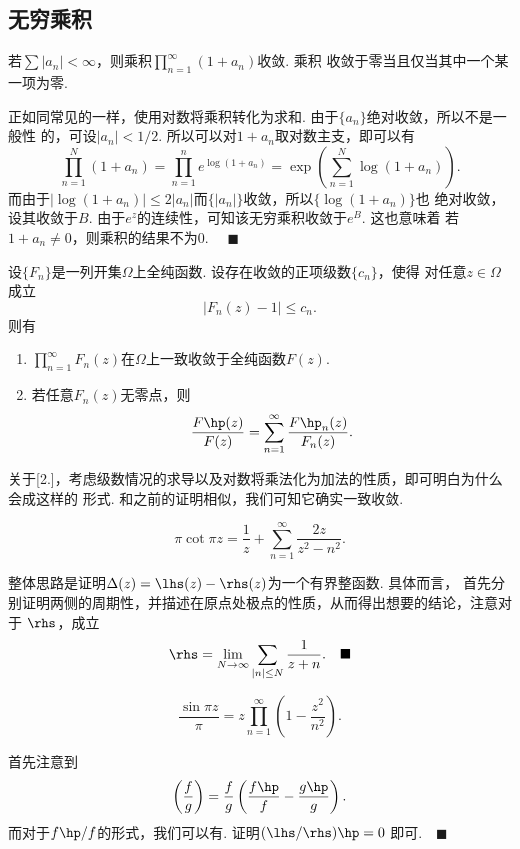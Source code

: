 
\subsection{无穷乘积}
  \begin{thm}
    若$\sum|a_n|<\infty$，则乘积$\prod_{n=1}^\infty(1+a_n)$收敛. 乘积
    收敛于零当且仅当其中一个某一项为零.
  \end{thm}
  \proof
    正如同常见的一样，使用对数将乘积转化为求和. 由于$\{a_n\}$绝对收敛，所以不是一般性
    的，可设$|a_n|<1/2$. 所以可以对$1+a_n$取对数主支，即可以有
    \[
      \prod_{n=1}^N(1+a_n) = \prod_{n=1}^ne^{\log(1+a_n)}
      = \exp\left(\sum_{n=1}^N\log(1+a_n)\right).
    \]
    而由于$|\log(1+a_n)|\le 2|a_n|$而$\{|a_n|\}$收敛，所以$\{\log(1+a_n)\}$也
    绝对收敛，设其收敛于$B$. 由于$e^z$的连续性，可知该无穷乘积收敛于$e^B$. 这也意味着
    若$1+a_n\ne 0$，则乘积的结果不为$0$. $\quad\blacksquare$

  \begin{thm}
    \label{thm: 无穷乘积、导数}
    设$\{F_n\}$是一列开集$\Omega$上全纯函数. 设存在收敛的正项级数$\{c_n\}$，使得
    对任意$z\in\Omega$成立
    \[
      |F_n(z) - 1| \le c_n.
    \]
    则有
    \begin{enumerate}
      \item $\prod_{n=1}^\infty F_n(z)$在$\Omega$上一致收敛于全纯函数$F(z)$.
      \item 若任意$F_n(z)$无零点，则
        \[
          \frac{F\hp(z)}{F(z)} = \sum_{n=1}^\infty\frac{F\hp_n(z)}{F_n(z)}.
        \]
    \end{enumerate}
  \end{thm}
  \remark
    关于[2.]，考虑级数情况的求导以及对数将乘法化为加法的性质，即可明白为什么会成这样的
    形式.
  \proof
    和之前的证明相似，我们可知它确实一致收敛.     

  \begin{thm}
    \label{thm: cot级数展开}
    \[
      \pi\cot\pi z=\frac{1}{z}+\sum_{n=1}^\infty\frac{2z}{z^2-n^2}.
    \]
  \end{thm}
  \proof
    整体思路是证明$\Delta(z) = \lhs(z) -  \rhs(z)$为一个有界整函数. 具体而言，
    首先分别证明两侧的周期性，并描述在原点处极点的性质，从而得出想要的结论，注意对于
    $\rhs$，成立
    \[
      \rhs = \lim_{N\to\infty}\sum_{|n|\le N}\frac{1}{z+n}. \quad\blacksquare
    \]

  \begin{thm}
    \[
      \frac{\sin\pi z}{\pi} = z\prod_{n=1}^\infty\left(1-\frac{z^2}{n^2}\right).
    \]
  \end{thm}
  \proof
    首先注意到
    \[
      \left(\frac{f}{g}\right) = \frac{f}{g}
      \left( \frac{f\hp}{f} - \frac{g\hp}{g} \right).
    \]
    而对于$f\hp/f$的形式，我们可以有. 证明$(\lhs/\rhs)\hp=0$
    即可.$\quad\blacksquare$

